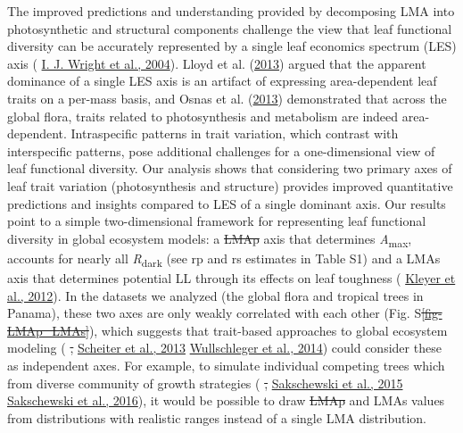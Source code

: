 \documentclass[
  12pt,
  a4paper,
,tablecaptionabove
]{scrartcl}
\providecommand{\DIFaddtex}[1]{{\protect\color{blue}\uwave{#1}}} %
\providecommand{\DIFdeltex}[1]{{\protect\color{red}\sout{#1}}}                      %
\providecommand{\DIFaddbegin}{} %
\providecommand{\DIFaddend}{} %
\providecommand{\DIFdelbegin}{} %
\providecommand{\DIFdelend}{} %
\providecommand{\DIFadd}[1]{\texorpdfstring{\DIFaddtex{#1}}{#1}} %
\providecommand{\DIFdel}[1]{\texorpdfstring{\DIFdeltex{#1}}{}} %
\newcommand{\DIFscaledelfig}{0.5}
\newlength{\DIFdelgraphicswidth} %
\newlength{\DIFdelgraphicsheight} %
\newcommand{\DIFaddincludegraphics}[2][]{{\color{blue}\fbox{\DIFOincludegraphics[#1]{#2}}}} %
\newcommand{\DIFdelincludegraphics}[2][]{%
\sbox{\DIFdelgraphicsbox}{\DIFOincludegraphics[#1]{#2}}%
\settoboxwidth{\DIFdelgraphicswidth}{\DIFdelgraphicsbox} %
\settoboxtotalheight{\DIFdelgraphicsheight}{\DIFdelgraphicsbox} %
\scalebox{\DIFscaledelfig}{%
\parbox[b]{\DIFdelgraphicswidth}{\usebox{\DIFdelgraphicsbox}\\[-\baselineskip] \rule{\DIFdelgraphicswidth}{0em}}\llap{\resizebox{\DIFdelgraphicswidth}{\DIFdelgraphicsheight}{%
\setlength{\unitlength}{\DIFdelgraphicswidth}%
\begin{picture}(1,1)%
\thicklines\linethickness{2pt} %
{\color[rgb]{1,0,0}\put(0,0){\framebox(1,1){}}}%
{\color[rgb]{1,0,0}\put(0,0){\line( 1,1){1}}}%
{\color[rgb]{1,0,0}\put(0,1){\line(1,-1){1}}}%
\end{picture}%
}\hspace*{3pt}}} %
} %
\DeclareRobustCommand{\DIFaddbegin}{\DIFOaddbegin \let\includegraphics\DIFaddincludegraphics} %
\DeclareRobustCommand{\DIFaddend}{\DIFOaddend \let\includegraphics\DIFOincludegraphics} %
\DeclareRobustCommand{\DIFdelbegin}{\DIFOdelbegin \let\includegraphics\DIFdelincludegraphics} %
\DeclareRobustCommand{\DIFdelend}{\DIFOaddend \let\includegraphics\DIFOincludegraphics} %
\begin{document}
The improved predictions and understanding provided by decomposing LMA
into photosynthetic and structural components challenge the view that
leaf functional diversity can be accurately represented by a single leaf
economics spectrum (LES) axis (\protect\DIFdelbegin %
\DIFdelend \DIFaddbegin \hyperlink{ref-Wright2004a}{I. J.
Wright et al., 2004}\DIFaddend ). Lloyd et al.
(\protect\hyperlink{ref-Lloyd2013}{2013}) argued that the apparent
dominance of a single LES axis is an artifact of expressing
area-dependent leaf traits on a per-mass basis, and Osnas et al.
(\protect\hyperlink{ref-Osnas2013}{2013}) demonstrated that across the
global flora, traits related to photosynthesis and metabolism are indeed
area-dependent. Intraspecific patterns in trait variation, which
contrast with interspecific patterns, pose additional challenges for a
one-dimensional view of leaf functional diversity. Our analysis shows
that considering two primary axes of leaf trait variation
(photosynthesis and structure) provides improved quantitative
predictions and insights compared to LES of a single dominant axis. Our
results point to a simple two-dimensional framework for representing
leaf functional diversity in global ecosystem models: a \DIFdelbegin \DIFdel{LMAp }\DIFdelend \DIFaddbegin \DIFadd{LMAm }\DIFaddend axis that
determines \emph{A}\textsubscript{max}, accounts for nearly all
\emph{R}\textsubscript{dark} (see rp and rs estimates in Table S1) and a
LMAs axis that determines potential LL through its effects on leaf
toughness (\protect\DIFdelbegin %
\DIFdelend \DIFaddbegin \hyperlink{ref-Kleyer2012}{Kleyer et al., 2012}\DIFaddend ). In
the datasets we analyzed (the global flora and tropical trees in
Panama), these two axes are only weakly correlated with each other (Fig.
S\DIFdelbegin \DIFdel{\ref{fig-LMAp_LMAs}}\DIFdelend \DIFaddbegin \DIFadd{\ref{fig-LMAm_LMAs}}\DIFaddend ), which suggests that trait-based approaches to
global ecosystem modeling (\protect\DIFdelbegin %
\DIFdel{, }\DIFdelend \DIFaddbegin \hyperlink{ref-Scheiter2013}{Scheiter
et al., 2013}\DIFadd{; }\DIFaddend \protect\DIFdelbegin %
\DIFdelend \DIFaddbegin \hyperlink{ref-Wullschleger2014}{Wullschleger et
al., 2014}\DIFaddend ) could consider these as independent axes. For example, to
simulate individual competing trees which from diverse community of
growth strategies (\protect\DIFdelbegin %
\DIFdel{, }\DIFdelend \DIFaddbegin \hyperlink{ref-Sakschewski2015}{Sakschewski
et al., 2015}\DIFadd{; }\DIFaddend \protect\DIFdelbegin %
\DIFdelend \DIFaddbegin \hyperlink{ref-Sakschewski2016}{Sakschewski et
al., 2016}\DIFaddend ), it would be possible to draw \DIFdelbegin \DIFdel{LMAp }\DIFdelend \DIFaddbegin \DIFadd{LMAm }\DIFaddend and LMAs values from
distributions with realistic ranges instead of a single LMA
distribution.
\end{document}
